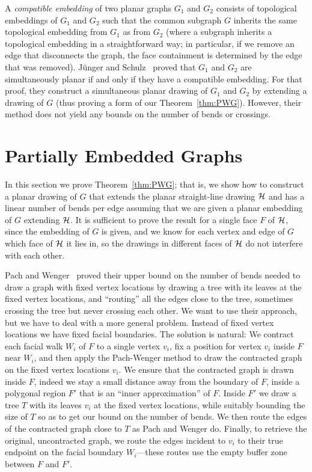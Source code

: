 \documentclass{llncs}
\begin{document}
A \emph{compatible embedding} of two planar graphs $G_1$ and $G_2$ consists of topological embeddings of $G_1$ and $G_2$ such that the common subgraph $G$ inherits the same topological embedding from $G_1$ as from $G_2$ (where a subgraph inherits a topological embedding in a straightforward way; in particular, if we remove an edge that disconnects the graph, the face containment is determined by the edge that was removed). J{\"u}nger and Schulz~\cite{JS} proved that $G_1$ and $G_2$ are simultaneously planar if and only if they have a compatible embedding. For that proof, they construct a simultaneous planar drawing of $G_1$ and $G_2$ by extending a drawing of $G$ (thus proving a form of our Theorem~\ref{thm:PWG}). However, their method does not yield any bounds on the number of bends or crossings.


\section{Partially Embedded Graphs}\label{sec:PEG}

In this section we prove Theorem~\ref{thm:PWG}; that is, we show how to construct a planar drawing of $G$ that extends the planar straight-line drawing ${\cal H}$ and has a linear number of bends per edge assuming that we are given a planar embedding of $G$ extending $\cal H$. It is sufficient to prove the result for a single face $F$ of $\cal H$, since the embedding of $G$ is given, and we know for each vertex and edge of $G$ which face of ${\cal H}$ it lies in, so the drawings in different faces of $\cal H$ do not interfere with each other.

Pach and Wenger~\cite{PW01} proved their upper bound on the number of bends needed to draw a graph with fixed vertex locations by drawing a tree with its leaves at the fixed vertex locations, and ``routing'' all the edges close to the tree, sometimes crossing the tree but never crossing each other. We want to use their approach, but we have to deal with a more general problem. Instead of fixed vertex locations we have fixed facial boundaries. The solution is natural: We contract each facial walk $W_i$ of $F$ to a single vertex $v_i$, fix a position for vertex $v_i$ inside $F$ near $W_i$, and then apply the Pach-Wenger method to draw the contracted graph on the fixed vertex locations $v_i$. We ensure that the contracted graph is drawn inside $F$, indeed we
stay a small distance away
from the boundary of $F$, inside a polygonal region $F'$ that is an ``inner approximation'' of $F$. Inside $F'$ we draw a tree $T$ with its leaves $v_i$ at the fixed vertex locations, while suitably bounding the size of $T$ so as to get our bound on the number of bends. We then route the edges of the contracted graph close to $T$ as  Pach and Wenger do. Finally, to retrieve the original, uncontracted graph,  we route the edges incident to $v_i$ to their true endpoint on the facial boundary $W_i$---these routes use the empty buffer zone between $F$ and $F'$.
\end{document}

